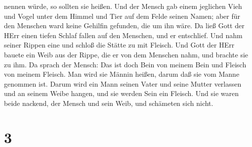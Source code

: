 nennen würde, so sollten sie heißen.  Und der Mensch gab
einem jeglichen Vieh und Vogel unter dem Himmel und Tier auf dem Felde
seinen Namen; aber für den Menschen ward keine Gehilfin gefunden, die um
ihn wäre.  Da ließ Gott der HErr einen tiefen Schlaf fallen
auf den Menschen, und er entschlief. Und nahm seiner Rippen eine und
schloß die Stätte zu mit Fleisch.  Und Gott der HErr bauete
ein Weib aus der Rippe, die er von dem Menschen nahm, und brachte sie zu
ihm.  Da sprach der Mensch: Das ist doch Bein von meinem
Bein und Fleisch von meinem Fleisch. Man wird sie Männin heißen, darum
daß sie vom Manne genommen ist.  Darum wird ein Mann seinen
Vater und seine Mutter verlassen und an seinem Weibe hangen, und sie
werden Sein ein Fleisch.  Und sie waren beide nackend, der
Mensch und sein Weib, und schämeten sich nicht.

\hypertarget{section-2}{%
\section{3}\label{section-2}}

